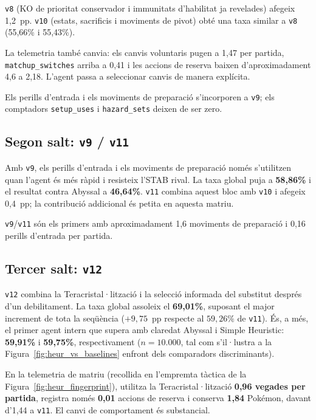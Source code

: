 \texttt{v8} (KO de prioritat conservador i immunitats d'habilitat ja revelades) afegeix 1,2~pp. \texttt{v10} (estats, sacrificis i moviments de pivot) obté una taxa similar a \texttt{v8} (55,66\% i 55,43\%).

La telemetria també canvia: els canvis voluntaris pugen a 1,47 per partida, \texttt{matchup\_switches} arriba a 0,41 i les accions de reserva baixen d'aproximadament 4,6 a 2,18. L'agent passa a seleccionar canvis de manera explícita.

Els perills d'entrada i els moviments de preparació s'incorporen a \texttt{v9}; els comptadors \texttt{setup\_uses} i \texttt{hazard\_sets} deixen de ser zero.

\subsection{Segon salt: \texttt{v9} / \texttt{v11}}

Amb \texttt{v9}, els perills d'entrada i els moviments de preparació només s'utilitzen quan l'agent és més ràpid i resisteix l'STAB rival. La taxa global puja a \textbf{58,86\%} i el resultat contra Abyssal a \textbf{46,64\%}. \texttt{v11} combina aquest bloc amb \texttt{v10} i afegeix 0,4~pp; la contribució addicional és petita en aquesta matriu.

\texttt{v9}/\texttt{v11} són els primers amb aproximadament 1,6 moviments de preparació i 0,16 perills d'entrada per partida.

\subsection{Tercer salt: \texttt{v12}}

\texttt{v12} combina la Teracristal·lització i la selecció informada del substitut després d'un debilitament. La taxa global assoleix el \textbf{69,01\%}, suposant el major increment de tota la seqüència ($+9{,}75$~pp respecte al $59{,}26\%$ de \texttt{v11}). És, a més, el primer agent intern que supera amb claredat Abyssal i Simple Heuristic: \textbf{59,91\%} i \textbf{59,75\%}, respectivament ($n=10.000$, tal com s'il·lustra a la Figura~\ref{fig:heur_vs_baselines} enfront dels comparadors discriminants).

En la telemetria de matriu (recollida en l'empremta tàctica de la Figura~\ref{fig:heur_fingerprint}), utilitza la Teracristal·lització \textbf{0,96 vegades per partida}, registra només \textbf{0,01} accions de reserva i conserva \textbf{1,84} Pokémon, davant d'1,44 a \texttt{v11}. El canvi de comportament és substancial.

